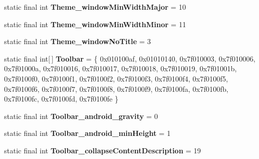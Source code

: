 \begin{DoxyCompactItemize}
\item 
\hypertarget{classandroid_1_1support_1_1design_1_1_r_1_1styleable_aef4318c5ae1271c7c5bfcaff8a84fb59}{}static final int {\bfseries Theme\+\_\+window\+Min\+Width\+Major} = 10\label{classandroid_1_1support_1_1design_1_1_r_1_1styleable_aef4318c5ae1271c7c5bfcaff8a84fb59}

\item 
\hypertarget{classandroid_1_1support_1_1design_1_1_r_1_1styleable_acddbec2a60fbc1ee3c8e064ab1a661e9}{}static final int {\bfseries Theme\+\_\+window\+Min\+Width\+Minor} = 11\label{classandroid_1_1support_1_1design_1_1_r_1_1styleable_acddbec2a60fbc1ee3c8e064ab1a661e9}

\item 
\hypertarget{classandroid_1_1support_1_1design_1_1_r_1_1styleable_adbba9032a2d1944c61aa0f223ef77b75}{}static final int {\bfseries Theme\+\_\+window\+No\+Title} = 3\label{classandroid_1_1support_1_1design_1_1_r_1_1styleable_adbba9032a2d1944c61aa0f223ef77b75}

\item 
\hypertarget{classandroid_1_1support_1_1design_1_1_r_1_1styleable_a7783ebe780dbe2a845802a40519a46e9}{}static final int\mbox{[}$\,$\mbox{]} {\bfseries Toolbar} = \{ 0x010100af, 0x01010140, 0x7f010003, 0x7f010006, 0x7f01000a, 0x7f010016, 0x7f010017, 0x7f010018, 0x7f010019, 0x7f01001b, 0x7f0100f0, 0x7f0100f1, 0x7f0100f2, 0x7f0100f3, 0x7f0100f4, 0x7f0100f5, 0x7f0100f6, 0x7f0100f7, 0x7f0100f8, 0x7f0100f9, 0x7f0100fa, 0x7f0100fb, 0x7f0100fc, 0x7f0100fd, 0x7f0100fe \}\label{classandroid_1_1support_1_1design_1_1_r_1_1styleable_a7783ebe780dbe2a845802a40519a46e9}

\item 
\hypertarget{classandroid_1_1support_1_1design_1_1_r_1_1styleable_ae9f189e116f70336a287fd07ccbad870}{}static final int {\bfseries Toolbar\+\_\+android\+\_\+gravity} = 0\label{classandroid_1_1support_1_1design_1_1_r_1_1styleable_ae9f189e116f70336a287fd07ccbad870}

\item 
\hypertarget{classandroid_1_1support_1_1design_1_1_r_1_1styleable_a577363bd15a566f94f5c7a9f24cf1ab5}{}static final int {\bfseries Toolbar\+\_\+android\+\_\+min\+Height} = 1\label{classandroid_1_1support_1_1design_1_1_r_1_1styleable_a577363bd15a566f94f5c7a9f24cf1ab5}

\item 
\hypertarget{classandroid_1_1support_1_1design_1_1_r_1_1styleable_a2ad949787d7fa8e09c179eaa0ebb74aa}{}static final int {\bfseries Toolbar\+\_\+collapse\+Content\+Description} = 19\label{classandroid_1_1support_1_1design_1_1_r_1_1styleable_a2ad949787d7fa8e09c179eaa0ebb74aa}


\end{DoxyCompactItemize}
